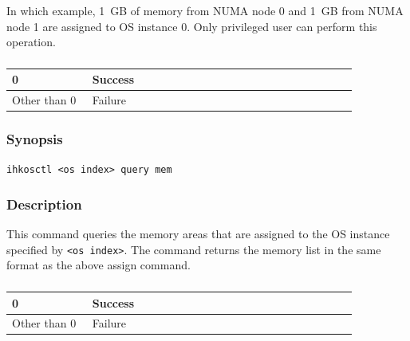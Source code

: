 \documentclass[twoside,11pt,fleqn]{book}
\begin{document}
In which example, 1~GB of memory from NUMA node 0 and 1~GB from NUMA node 1 are assigned to OS instance 0.
Only privileged user can perform this operation.

\subsubsection*{}
\begin{table}[!h]
\footnotesize
\begin{tabular}{|p{0.20\linewidth}|p{0.66\linewidth}|} \hline
0&Success\\ \hline
Other than 0&Failure\\ \hline
\end{tabular}
\vspace{-0em}
\end{table}
\FloatBarrier

\subsubsection{}
\subsubsection*{Synopsis}{\quad} \texttt{ihkosctl <os index> query mem}
\subsubsection*{Description}{\quad}
This command queries the memory areas that are assigned to the OS instance specified by \texttt{<os index>}.
The command returns the memory list in the same format as the above
assign command.

\subsubsection*{}
\begin{table}[!h]
\footnotesize
\begin{tabular}{|p{0.20\linewidth}|p{0.66\linewidth}|} \hline
0&Success\\ \hline
Other than 0&Failure\\ \hline
\end{tabular}
\vspace{-0em}
\end{table}
\FloatBarrier
\end{document}
